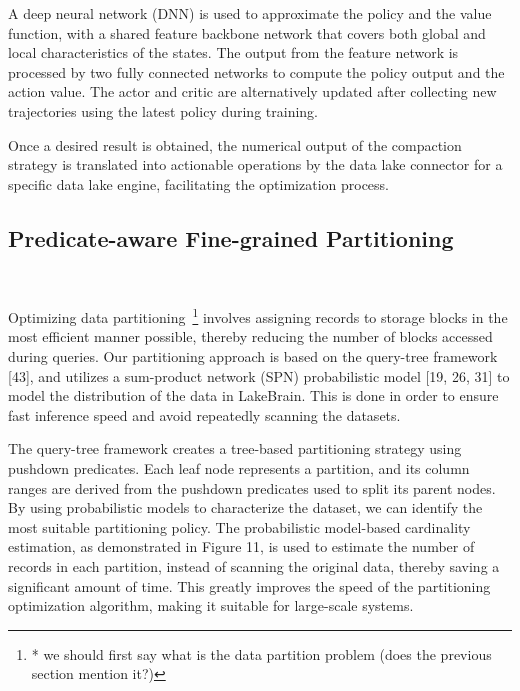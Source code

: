 A deep neural network (DNN) is used to approximate the policy and the value function, with a shared feature backbone network that covers both global and local characteristics of the states. The output from the feature network is processed by two fully connected networks to compute the policy output and the action value. The actor and critic are alternatively updated after collecting new trajectories using the latest policy during training.

Once a desired result is obtained, the numerical output of the compaction strategy is translated into actionable operations by the data lake connector for a specific data lake engine, facilitating the optimization process.


\subsection{Predicate-aware Fine-grained Partitioning}~\label{subsec:partition}

Optimizing data partitioning~\footnote{* we should first say what is the data partition problem (does the previous section mention it?)} involves assigning records to storage blocks in the most efficient manner possible, thereby reducing the number of blocks accessed during queries. Our partitioning approach is based on the query-tree framework [43], and utilizes a sum-product network (SPN) probabilistic model [19, 26, 31] to model the distribution of the data in LakeBrain. This is done in order to ensure fast inference speed and avoid repeatedly scanning the datasets.



The query-tree framework creates a tree-based partitioning strategy using pushdown predicates. Each leaf node represents a partition, and its column ranges are derived from the pushdown predicates used to split its parent nodes.
 By using probabilistic models to characterize the dataset, we can identify the most suitable partitioning policy. The probabilistic model-based cardinality estimation, as demonstrated in Figure 11, is used to estimate the number of records in each partition,  instead of scanning the original data, thereby saving a significant amount of time. This greatly improves the speed of the partitioning optimization algorithm, making it suitable for large-scale systems.

